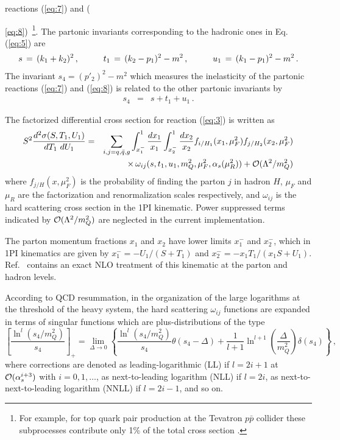 \documentclass[11pt]{article}
\def\beq{\begin{equation}}
\def\eeq{\end{equation}}
\def\ba{\begin{eqnarray}}
\def\ea{\end{eqnarray}}
\begin{document}
reactions (\ref{eq:7}) and ({\ref{eq:8})~\footnote{For example,
 for top quark pair production at the Tevatron
  $p\bar{p}$ collider these subprocesses contribute
  only 1\% of the total cross section 
\cite{Nason:1987xz,Beenakker:1988bq,Beenakker:1990maa}.}.  
The partonic invariants corresponding to the hadronic ones in Eq.(\ref{eq:5}) are
\begin{eqnarray}
  \label{eq:9}
s\,=\,(k_1+k_2)^2\, , \hspace*{10mm}t_1\,=\,(k_2-p_1)^2-m^2\, ,
\hspace*{10mm}u_1\,=\,(k_1-p_1)^2-m^2\, .
\end{eqnarray}
The invariant $s_4 = (p'_2)^2-m^2$ which measures the inelasticity of
the partonic reactions (\ref{eq:7}) and (\ref{eq:8}) is related to the
other partonic invariants by
\begin{eqnarray}
  \label{eq:10}
s_4 &=& s + t_1 + u_1\, .  
\end{eqnarray}



The factorized differential cross section for reaction (\ref{eq:3}) is written as 
\ba
S^2\frac{d^2 \sigma(S,T_1,U_1)}{dT_1 ~dU_1} &=& \sum_{i,j=q,\bar{q},g} \int_{x_1^-}^{1} \frac{dx_1}{x_1}
\int_{x_2^-}^{1}\frac{dx_2}{x_2} f_{i/H_1}(x_1,\mu_F^2) f_{j/H_2}(x_2,\mu_F^2) 
\nonumber\\ 
&&\times \, \omega_{ij}(s,t_1,u_1,m_Q^2, \mu_F^2,\alpha_s(\mu_R^2)) + {\cal O}(\Lambda^2/m_Q^2)
\label{diffXsec}
\ea
where $f_{j/H}(x,\mu_F^2)$ is the probability of finding the parton $j$ in hadron $H$, 
$\mu_F$ and $\mu_R$ are the factorization and renormalization scales respectively, and  
$\omega_{ij}$ is the hard scattering cross section in the 1PI kinematic. 
Power suppressed terms indicated by ${\cal O}(\Lambda^2/m_Q^2)$ are neglected in the current implementation.

The parton momentum fractions $x_1$ and $x_2$ have lower limits $x_1^-$ and $x_2^-$, which 
in 1PI kinematics are given by $x_1^- = -U_1/(S+T_1)$ and $x_2^-= -x_1 T_1/(x_1S+U_1)$.
Ref.~\cite{Beenakker:1990maa} contains an exact NLO treatment of this kinematic 
at the parton and hadron levels.

According to QCD resummation, in the organization of the large logarithms 
at the threshold of the heavy system, the hard scattering $\omega_{ij}$ functions are expanded in 
terms of singular functions which are plus-distributions of the type
\beq
\left[\frac{\ln^l{(s_4/m_Q^2)}}{s_4} \right]_{+} = \lim_{\Delta\rightarrow 0}\left\{\frac{\ln^l{(s_4/m_Q^2)}}{s_4}\theta(s_4-\Delta)
+\frac{1}{l+1}\ln^{l+1}{\left( \frac{\Delta}{m_Q^2}\right)}\delta(s_4)\right\}\,,
\label{plus}
\eeq
where corrections are denoted as leading-logarithmic (LL) if $l=2 i+1$ at ${\cal O}(\alpha_s^{i+3})$ with $i=0,1,\dots$, 
as next-to-leading logarithm (NLL) if $l=2 i$, as next-to-next-to-leading logarithm (NNLL) if $l=2 i - 1$, and so on.

}
\end{document}
